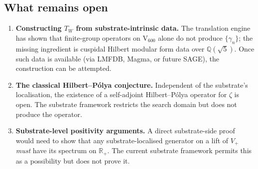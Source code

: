 \documentclass[11pt,a4paper]{article}
\newcommand{\Q}{\mathbb{Q}}
\newcommand{\R}{\mathbb{R}}
\newcommand{\Twit}{T_W}
\begin{document}
\subsection{What remains open}

\begin{enumerate}[leftmargin=*]
  \item \textbf{Constructing $\Twit$ from substrate-intrinsic data.}
        The translation engine has shown
        \cite{translationEngine} that finite-group operators on
        V$_{600}$ alone do not produce $\{\gamma_n\}$; the missing
        ingredient is cuspidal Hilbert modular form data over
        $\Q(\sqrt 5)$. Once such data is available (via LMFDB,
        Magma, or future SAGE), the construction can be attempted.
  \item \textbf{The classical Hilbert--P\'olya conjecture.}
        Independent of the substrate's localisation, the existence
        of a self-adjoint Hilbert--P\'olya operator for $\zeta$ is
        open. The substrate framework restricts the search domain
        but does not produce the operator.
  \item \textbf{Substrate-level positivity arguments.}
        A direct substrate-side proof would need to show that any
        substrate-localised generator on a lift of $V_+$
        \emph{must} have its spectrum on $\R_+$. The current substrate framework permits this
        as a possibility but does not prove it.
\end{enumerate}
\end{document}

